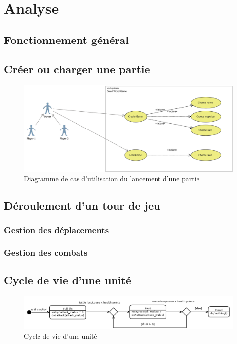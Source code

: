 \section{Analyse}

\subsection{Fonctionnement général}

\subsection{Créer ou charger une partie}

\begin{figure}[h]
  \centering
  \includegraphics[width=13cm]{schemas/uc_game_creation.png}
  \caption{Diagramme de cas d'utilisation du lancement d'une partie}
  \label{uc_game_creation}
\end{figure}


\subsection{Déroulement d'un tour de jeu}
\subsubsection{Gestion des déplacements}
\subsubsection{Gestion des combats}

\subsection{Cycle de vie d'une unité}

\begin{figure}[!h]
  \centering
  \includegraphics[width=13cm]{schemas/state-diagram.png}
  \caption{Cycle de vie d'une unité}
  \label{state-diagram}
\end{figure}


